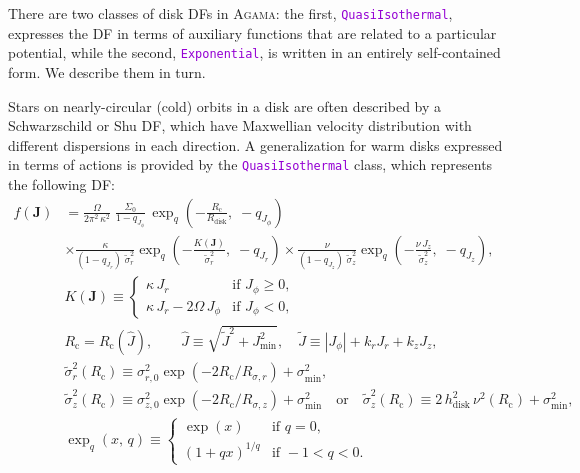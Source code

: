 \documentclass[12pt]{article}
\newcommand{\Agama}{\textsc{Agama}\xspace}
\newcommand{\ttt}[1]{\textcolor{darkviolet}{\texttt{#1}}}
\newcommand{\bJ}{\boldsymbol{J}}
\begin{document}
There are two classes of disk DFs in \Agama: the first, \ttt{QuasiIsothermal}, expresses the DF in terms of auxiliary functions that are related to a particular potential, while the second, \ttt{Exponential}, is written in an entirely self-contained form. We describe them in turn.

Stars on nearly-circular (cold) orbits in a disk are often described by a Schwarzschild or Shu DF, which have Maxwellian velocity distribution with different dispersions in each direction. A generalization for warm disks \cite{Dehnen1999} expressed in terms of actions \cite{BinneyMcMillan2011} is provided by the \ttt{QuasiIsothermal} class, which represents the following DF:
\begin{align*}
f(\bJ) &= \frac{\Omega}{2\pi^2\,\kappa^2}\; \frac{\Sigma_0}{1-q_{J_\phi}}\,
\exp_q\left(-\frac{R_\mathrm{c}}{R_\mathrm{disk}},\; -q_{J_\phi}\right) \\  &\times 
\frac{\kappa}{(1-q_{J_r})\;\tilde\sigma_r^2} 
\exp_q\left(-\frac{K(\bJ)}{\tilde\sigma_r^2},\; -q_{J_r}\right) \times
\frac{\nu}   {(1-q_{J_z})\;\tilde\sigma_z^2} 
\exp_q\left(-\frac{\nu\,   J_z}{\tilde\sigma_z^2},\; -q_{J_z}\right), \\
&K(\bJ) \equiv  \left\{ \begin{array}{ll}
\kappa\,J_r & \mbox{if }J_\phi\ge 0, \\
\kappa\,J_r - 2\Omega\,J_\phi & \mbox{if }J_\phi<0, \end{array} \right.\\
&R_\mathrm{c}=R_\mathrm{c}(\hat J), \qquad \hat J\equiv \sqrt{\tilde J^2 + J_\mathrm{min}^2}, \quad
\tilde J \equiv |J_\phi| + k_r J_r + k_z J_z, \\
&\tilde\sigma_r^2(R_\mathrm{c}) \equiv
\sigma_{r,0}^2 \exp( -2R_\mathrm{c} / R_{\sigma,r} ) + \sigma_\mathrm{min}^2,\\
&\tilde\sigma_z^2(R_\mathrm{c}) \equiv
\sigma_{z,0}^2 \exp( -2R_\mathrm{c} / R_{\sigma,z} )  + \sigma_\mathrm{min}^2  \quad\mbox{or}\quad 
\tilde\sigma_z^2(R_\mathrm{c}) \equiv 
2\,h_\mathrm{disk}^2\,\nu^2(R_\mathrm{c})  + \sigma_\mathrm{min}^2, \\
&\exp_q(x,\, q) \equiv \left\{ \begin{array}{ll}
\exp(x) & \mbox{if }q=0, \\
(1+qx)^{1/q} & \mbox{if }-1<q<0 . \end{array} \right.
\end{align*}
\end{document}

